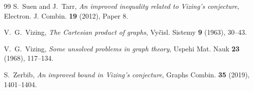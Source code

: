 \documentclass[10pt]{amsart}
\theoremstyle{remark}
\begin{document}
\begin{thebibliography}{99}
S.~Suen and J.~Tarr,
\emph{An improved inequality related to Vizing's conjecture},
Electron. J. Combin. \textbf{19} (2012), Paper 8.

V.~G.~Vizing,
\emph{The Cartesian product of graphs},
Vy\v{c}isl. Sistemy \textbf{9} (1963), 30--43.

V.~G.~Vizing,
\emph{Some unsolved problems in graph theory},
Uspehi Mat. Nauk \textbf{23} (1968), 117--134.

S.~Zerbib,
\emph{An improved bound in Vizing's conjecture},
Graphs Combin. \textbf{35} (2019), 1401--1404.

\end{thebibliography}

\bigskip
\end{document}
